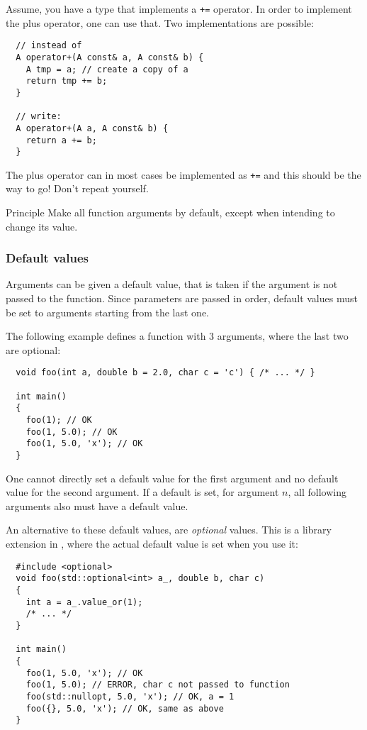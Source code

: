 \begin{example}
  Assume, you have a type  that implements a \texttt{+=} operator. In order to implement the plus operator, one can use that. Two implementations
  are possible:
  \begin{verbatim}
  // instead of
  A operator+(A const& a, A const& b) {
    A tmp = a; // create a copy of a
    return tmp += b;
  }

  // write:
  A operator+(A a, A const& b) {
    return a += b;
  }
  \end{verbatim}
  The plus operator can in most cases be implemented as \texttt{+=} and this should be the way to go! Don't repeat yourself.
\end{example}

\begin{guideline}{Principle}
  Make all function arguments  by default, except when intending to change its value.
\end{guideline}

\subsubsection{Default values}
Arguments can be given a default value, that is taken if the argument is not passed to the function. Since parameters are passed in order, default values
must be set to arguments starting from the last one.
\begin{example}
  The following example defines a function with 3 arguments, where the last two are optional:
  \begin{verbatim}
  void foo(int a, double b = 2.0, char c = 'c') { /* ... */ }

  int main()
  {
    foo(1); // OK
    foo(1, 5.0); // OK
    foo(1, 5.0, 'x'); // OK
  }
  \end{verbatim}
\end{example}

\begin{rem}
  One cannot directly set a default value for the first argument and no default value for the second argument. If a default is set, for argument $n$, all
  following arguments also must have a default value.

  An alternative to these default values, are \emph{optional} values. This is a library extension in \marginpar{[\cxx{17}]}, where the actual default
  value is set when you use it:
  \begin{verbatim}
  #include <optional>
  void foo(std::optional<int> a_, double b, char c)
  {
    int a = a_.value_or(1);
    /* ... */
  }

  int main()
  {
    foo(1, 5.0, 'x'); // OK
    foo(1, 5.0); // ERROR, char c not passed to function
    foo(std::nullopt, 5.0, 'x'); // OK, a = 1
    foo({}, 5.0, 'x'); // OK, same as above
  }
  \end{verbatim}
\end{rem}


